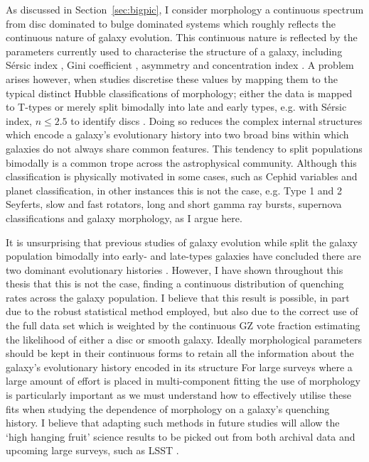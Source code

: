 As discussed in Section~\ref{sec:bigpic}, I consider morphology a continuous spectrum from disc dominated to bulge dominated systems which roughly reflects the continuous nature of galaxy evolution. This continuous nature is reflected by the parameters currently used to characterise the structure of a galaxy, including S\'ersic index \citep{sersic68}, Gini coefficient \citep{abraham03, lotz04}, asymmetry \citep{conselice00} and concentration index \citep{morgan58}. A problem arises however, when studies discretise these values by mapping them to the typical distinct Hubble classifications of morphology; either the data is mapped to T-types \citep{shimasaku01, brinchmann04, barro15} or merely split bimodally into late and early types, e.g. with S\'ersic index, $n \leq 2.5$ to identify discs \citep{ravindranath04, kelvin12, vika15}. Doing so reduces the complex internal structures which encode a galaxy's evolutionary history into two broad bins within which galaxies do not always share common features. This tendency to split populations bimodally is a common trope across the astrophysical community. Although this classification is physically motivated in some cases, such as Cephid variables and planet classification, in other instances this is not the case, e.g. Type 1 and 2 Seyferts, slow and fast rotators, long and short gamma ray bursts, supernova classifications and galaxy morphology, as I argue here. 

It is unsurprising that previous studies of galaxy evolution while split the galaxy population bimodally into early- and late-types galaxies have concluded there are two dominant evolutionary histories \citep[e.g.][]{schawinski14, casado15, belfiore16}. However, I have shown throughout this thesis that this is not the case, finding a continuous distribution of quenching rates across the galaxy population. I believe that this result is possible, in part due to the robust statistical method employed, but also due to the correct use of the full data set which is weighted by the continuous GZ vote fraction estimating the likelihood of either a disc or smooth galaxy. Ideally morphological parameters should be kept in their continuous forms to retain all the information about the galaxy's evolutionary history encoded in its structure \citep[e.g. see work by][]{peth16, savorgnan16, krywult16} For large surveys where a large amount of effort is placed in multi-component fitting \citep{haussler07, haussler11, haussler13, simard11, bruce14, vika15, johnston16} the use of morphology is particularly important as we must understand how to effectively utilise these fits when studying the dependence of morphology on a galaxy's quenching history. I believe that adapting such methods in future studies will allow the `high hanging fruit' science results to be picked out from both archival data and upcoming large surveys, such as LSST \citep{ivezic08}. 


